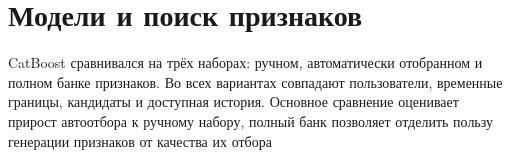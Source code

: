 \FloatBarrier
\section{Модели и поиск признаков}

CatBoost сравнивался на трёх наборах: ручном, автоматически отобранном
и полном банке признаков. Во всех вариантах совпадают пользователи,
временные границы, кандидаты и доступная история.
Основное сравнение оценивает прирост автоотбора к ручному набору,
полный банк позволяет отделить пользу генерации признаков от качества их отбора
